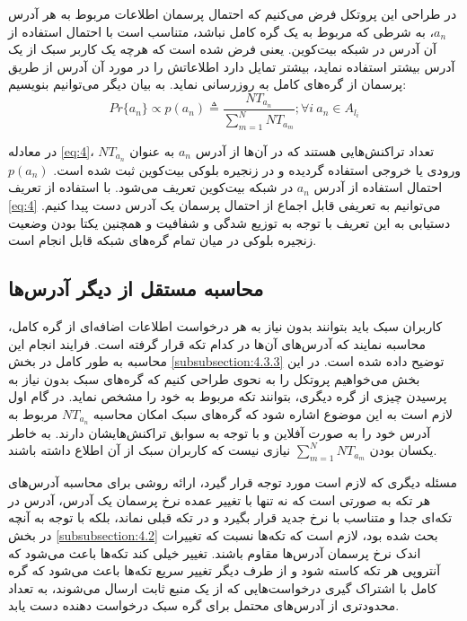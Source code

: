 در طراحی این پروتکل فرض می‌کنیم که احتمال پرسمان اطلاعات مربوط به هر آدرس $a_n$، به شرطی که مربوط به یک گره کامل نباشد، متناسب است با احتمال استفاده از آن آدرس در شبکه بیت‌کوین. یعنی فرض شده است که هرچه یک کاربر سبک از یک آدرس بیشتر استفاده نماید،‌ بیشتر تمایل دارد اطلاعاتش را در مورد آن آدرس از طریق پرسمان از گره‌های کامل به روزرسانی نماید. به بیان دیگر می‌توانیم بنویسیم:
\begin{equation}
Pr\{{a_n}\} \propto p(a_n) \triangleq \frac{NT_{a_n}}{\sum_{m=1}^{N}NT_{a_m}}; \forall i \  a_n \in A_{l_i}  \label{eq:4}
\end{equation}

در معادله \eqref{eq:4}، 
$NT_{a_n}$
تعداد تراکنش‌هایی هستند که در آن‌ها از آدرس $a_n$ به عنوان ورودی یا خروجی استفاده گردیده و در زنجیره بلوکی بیت‌کوین ثبت شده است. $p(a_n)$ احتمال استفاده از آدرس $a_n$ در شبکه بیت‌کوین تعریف می‌شود. با استفاده از تعریف  \eqref{eq:4} می‌توانیم به تعریفی قابل اجماع از احتمال پرسمان یک آدرس دست پیدا کنیم. دستیابی به این تعریف با توجه به توزیع شدگی و شفافیت و همچنین یکتا بودن وضعیت زنجیره بلوکی در میان تمام گره‌های شبکه قابل انجام است.  

\subsection{محاسبه مستقل از دیگر آدرس‌ها}
\label{subsubsection:4.3.1}
کاربران سبک  باید بتوانند بدون نیاز به هر درخواست اطلاعات اضافه‌ای از گره کامل، محاسبه نمایند که آدرس‌های آن‌ها در کدام تکه قرار گرفته است. فرایند انجام این محاسبه به طور کامل در بخش \ref{subsubsection:4.3.3} توضیح داده شده است. در این بخش می‌خواهیم پروتکل را به نحوی طراحی کنیم که گره‌های سبک بدون نیاز به پرسیدن چیزی از گره دیگری، بتوانند تکه مربوط به خود را مشخص نماید. در گام اول لازم است به این موضوع اشاره شود که گره‌های سبک امکان محاسبه $NT_{a_n}$ مربوط به آدرس خود را به صورت آفلاین و با توجه به سوابق تراکنش‌هایشان دارند. به خاطر یکسان بودن
$\sum_{m=1}^{N}NT_{a_m}$
نیازی نیست که کاربران سبک از آن اطلاع داشته باشند.

مسئله دیگری که لازم است مورد توجه قرار گیرد، ارائه روشی برای محاسبه آدرس‌های هر تکه به صورتی است که نه تنها با تغییر عمده نرخ پرسمان یک آدرس، آدرس در تکه‌ای جدا و متناسب با نرخ جدید قرار بگیرد و در تکه قبلی نماند، بلکه با توجه به آنچه در بخش \ref{subsubsection:4.2} بحث شده بود، لازم است که تکه‌ها نسبت که تغییرات اندک نرخ پرسمان آدرس‌ها مقاوم باشند. تغییر خیلی کند تکه‌ها باعث می‌شود که آنتروپی هر تکه کاسته شود و از طرف دیگر تغییر سریع تکه‌ها باعث می‌شود که گره کامل با اشتراک گیری درخواست‌هایی که از یک منبع ثابت ارسال می‌شوند، به تعداد محدودتری از آدرس‌های محتمل برای گره سبک درخواست دهنده دست یابد.

